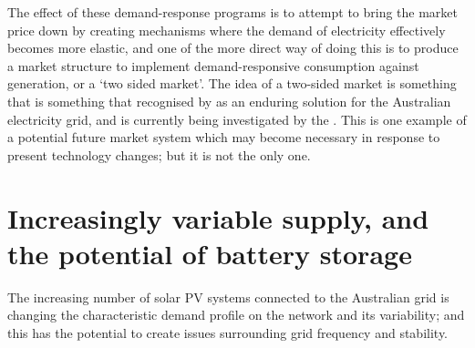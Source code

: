 The effect of these demand-response programs is to attempt to bring the market price down by creating mechanisms where the demand of electricity effectively becomes more elastic, and one of the more direct way of doing this is to produce a market structure to implement demand-responsive consumption against generation, or a `two sided market'.
The idea of a two-sided market is something that is something that recognised by \cite{australianenergymarketcommission2020} as an enduring solution for the Australian electricity grid, and is currently being investigated by the \cite{energysecurityboard2020}.
This is one example of a potential future market system which may become necessary in response to present technology changes; but it is not the only one.

\DIFaddbegin {}

\noindent {}

\DIFaddend \section{Increasingly variable supply, and the potential of battery storage}\DIFaddbegin \label{sec:intro_part12}
\DIFaddend 

The increasing number of solar PV systems connected to the Australian grid is changing the characteristic demand profile on the network and its variability; and this has the potential to create issues surrounding grid frequency and stability.

